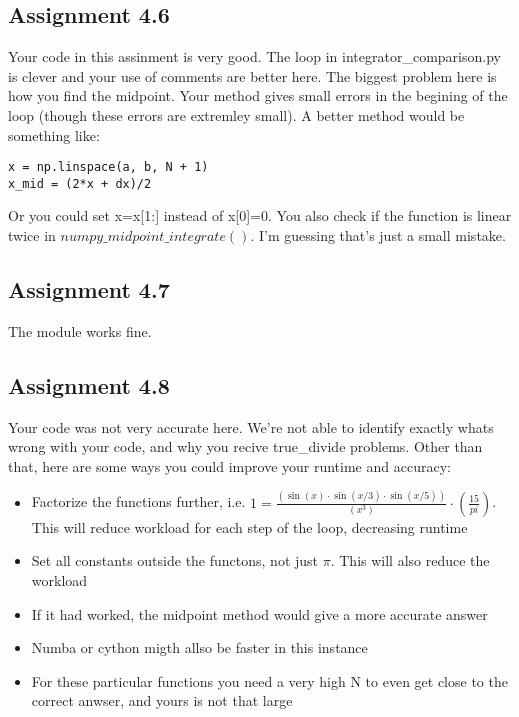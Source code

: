 \documentclass[a4paper]{article}
\begin{document}
\subsection*{Assignment 4.6}
Your code in this assinment is very good. The loop in integrator\_comparison.py is clever and your use of comments are better here. The biggest problem here is how you find the midpoint. Your method gives small errors in the begining of the loop (though these errors are extremley small). A better method would be something like:
\begin{lstlisting}
x = np.linspace(a, b, N + 1)
x_mid = (2*x + dx)/2
\end{lstlisting}
Or you could set x=x[1:] instead of x[0]=0. You also check if the function is linear twice in $numpy\_ midpoint\_ integrate()$. I'm guessing that's just a small mistake.

\subsection*{Assignment 4.7}
The module works fine.

\subsection*{Assignment 4.8}
Your code was not very accurate here. We're not able to identify exactly whats wrong with your code, and why you recive true\_divide problems. Other than that, here are some ways you could improve your runtime and accuracy:
\begin{itemize}
	\item Factorize the functions further, i.e. $1 = \frac{(\sin(x)\cdot \sin(x/3)\cdot \sin(x/5))}{(x^3)}\cdot (\frac{15}{pi})$. This will reduce workload for each step of the loop, decreasing runtime
	\item Set all constants outside the functons, not just $\pi$. This will also reduce the workload
	\item If it had worked, the midpoint method would give a more accurate answer
	\item Numba or cython migth allso be faster in this instance
	\item For these particular functions you need a very high N to even get close to the correct anwser, and yours is not that large
\end{itemize}







\end{document}
